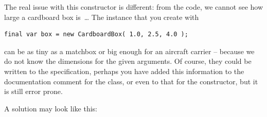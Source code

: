 \documentclass[11pt,a4paper, titlepage, parskip=half, headsepline, footsepline, cleardoublepage=current, headheight=1cm]{scrbook}
\begin{document}
The real issue with this constructor is different: from the code, we cannot see how large a cardboard box is~… The instance that you create with
\begin{lstlisting}
final var box = new CardboardBox( 1.0, 2.5, 4.0 );
\end{lstlisting}
can be as tiny as a matchbox or big enough for an aircraft carrier – because we do not know the dimensions for the given arguments. Of course, they could be written to the specification, perhaps you have added this information to the documentation comment for the class, or even to that for the constructor, but it is still error prone.

A solution may look like this:
\end{document}

